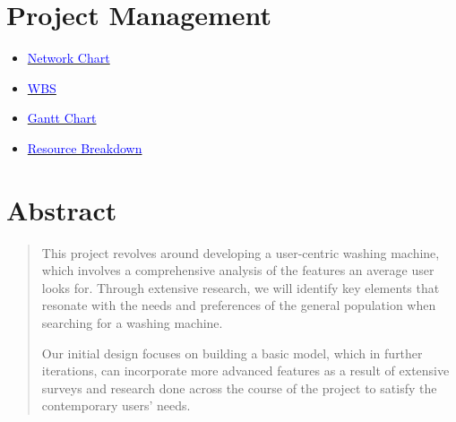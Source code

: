 \documentclass[table]{rapportCS}
\begin{document}
\clearpage
\section{Project Management}\label{sec:projectmanagement}

\begin{itemize}[label=$\bullet$]
    \item {\href{https://owncloud.iitd.ac.in/nextcloud/index.php/s/aRx7A3B8AFbZ32Y}{\textcolor{blue}{Network Chart}}}
    \item {\href{https://owncloud.iitd.ac.in/nextcloud/index.php/s/pnCtc4MAoRkQte2}{\textcolor{blue}{WBS}}}
    \item {\href{https://owncloud.iitd.ac.in/nextcloud/index.php/s/MDxAqgJGXYexDLy}{\textcolor{blue}{Gantt Chart}\index{\textcolor{blue}{Gantt Chart}}}}
    \item {\href{https://owncloud.iitd.ac.in/nextcloud/index.php/s/7HQLz7ibrgMm5mY}{\textcolor{blue}{Resource Breakdown}}}
\end{itemize}


\section{Abstract}\label{sec:abstract} 
\renewcommand{\abstractname}{Cleaning Machine}

\begin{abstract}
   
This project revolves around developing a user-centric  washing machine, which involves a comprehensive analysis of the features an average user looks for. Through extensive research, we will identify key elements that resonate with the needs and preferences of the general population when searching for a washing machine.

Our initial design focuses on building a basic model, which in further iterations, can incorporate more advanced features as a result of extensive surveys and research done across the course of the project to satisfy the contemporary users' needs.
\end{abstract}
\end{document}
